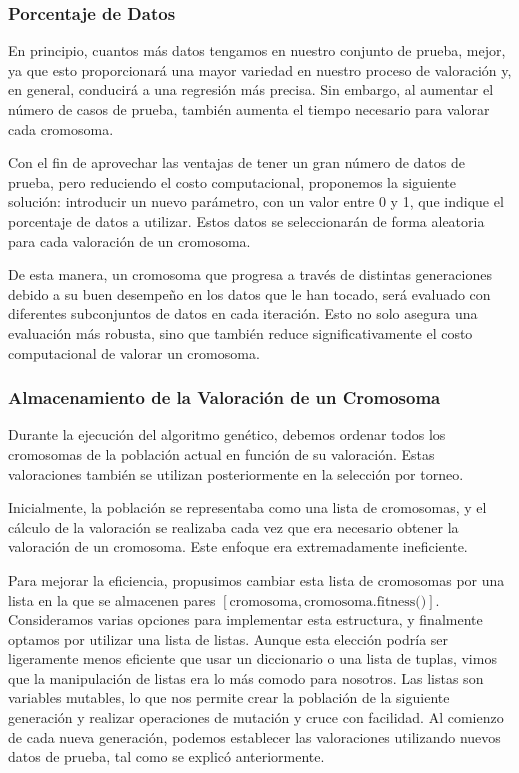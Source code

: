 \documentclass[conference,a4paper]{IEEEtran}
\begin{document}
\subsubsection{Porcentaje de Datos}
En principio, cuantos más datos tengamos en nuestro conjunto de prueba, mejor, ya que esto proporcionará una mayor variedad en nuestro proceso de valoración y, en general, conducirá a una regresión más precisa. Sin embargo, al aumentar el número de casos de prueba, también aumenta el tiempo necesario para valorar cada cromosoma. 

Con el fin de aprovechar las ventajas de tener un gran número de datos de prueba, pero reduciendo el costo computacional, proponemos la siguiente solución: introducir un nuevo parámetro, con un valor entre 0 y 1, que indique el porcentaje de datos a utilizar. Estos datos se seleccionarán de forma aleatoria para cada valoración de un cromosoma. 

De esta manera, un cromosoma que progresa a través de distintas generaciones debido a su buen desempeño en los datos que le han tocado, será evaluado con diferentes subconjuntos de datos en cada iteración. Esto no solo asegura una evaluación más robusta, sino que también reduce significativamente el costo computacional de valorar un cromosoma.

\subsubsection{Almacenamiento de la Valoración de un Cromosoma}
Durante la ejecución del algoritmo genético, debemos ordenar todos los cromosomas de la población actual en función de su valoración. Estas valoraciones también se utilizan posteriormente en la selección por torneo.

Inicialmente, la población se representaba como una lista de cromosomas, y el cálculo de la valoración se realizaba cada vez que era necesario obtener la valoración de un cromosoma. Este enfoque era extremadamente ineficiente.

Para mejorar la eficiencia, propusimos cambiar esta lista de cromosomas por una lista en la que se almacenen pares \([\text{cromosoma}, \text{cromosoma.fitness()}]\). Consideramos varias opciones para implementar esta estructura, y finalmente optamos por utilizar una lista de listas. Aunque esta elección podría ser ligeramente menos eficiente que usar un diccionario o una lista de tuplas, vimos que la manipulación de listas era lo más comodo para nosotros. Las listas son variables mutables, lo que nos permite crear la población de la siguiente generación y realizar operaciones de mutación y cruce con facilidad. Al comienzo de cada nueva generación, podemos establecer las valoraciones utilizando nuevos datos de prueba, tal como se explicó anteriormente.
\end{document}
